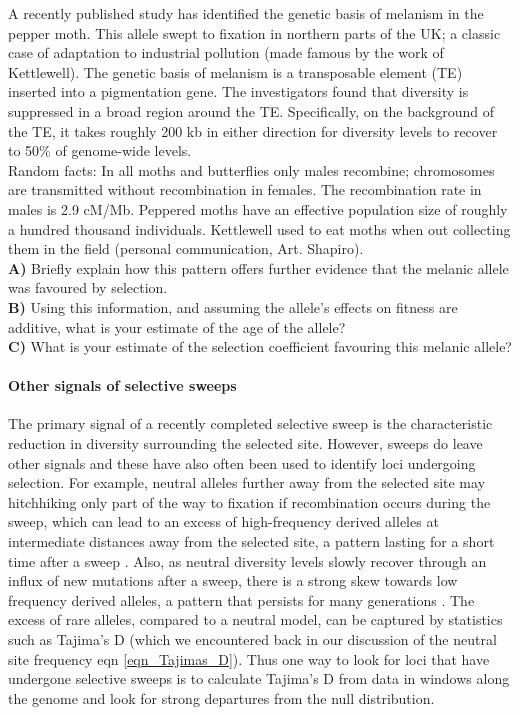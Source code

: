 \begin{question}
A recently published study has identified the genetic basis of
melanism in the pepper moth. This allele swept to fixation in northern
parts of the UK; a classic case of adaptation to industrial pollution
(made famous by the work of Kettlewell). The genetic basis of melanism
is a transposable element (TE) inserted into a pigmentation gene. The
investigators found that diversity is suppressed in a broad region
around the TE. Specifically, on the background of the TE, it takes
roughly 200 kb in either direction for diversity levels to recover to
50\% of genome-wide levels. \\

Random facts: In all moths and butterflies only males recombine;
chromosomes are transmitted without recombination in females. The
recombination rate in males is 2.9 cM/Mb.  Peppered moths have an
effective population size of roughly a hundred thousand
individuals. Kettlewell used to eat moths when out collecting them in
the field (personal communication, Art. Shapiro). \\
{\bf A)} Briefly explain how this pattern offers further evidence that the melanic allele was favoured by selection.\\
{\bf B)} Using this information, and assuming the allele's effects on fitness are additive, what is your estimate of the age of the allele? \\
{\bf C)} What is your estimate of the selection coefficient favouring this melanic allele?
\end{question}


\paragraph{Other signals of selective sweeps}
The primary signal of a recently completed selective sweep is the
characteristic reduction in diversity surrounding the selected site.
However, sweeps do leave other signals and these have also often been
used to identify loci undergoing selection. 
For example, neutral alleles further away from the selected site may
hitchhiking only part of the way to fixation if recombination occurs during
the sweep, which can lead to an excess of high-frequency
derived alleles at intermediate distances away from the selected site,
a pattern lasting for a short time after a sweep \citep{Fay:00,Przeworski:02,Kim:06}.
Also, as neutral diversity levels slowly recover through an influx of
new mutations after a sweep, there is a strong skew towards low
frequency derived alleles, a pattern that persists for many
generations \citep{Braverman:95, Przeworski:02,Kim:06}. The excess of
rare alleles, compared to a neutral model, can be captured by statistics such as Tajima's D (which
we encountered back in our discussion of the neutral site frequency eqn
\ref{eqn_Tajimas_D}). Thus one way to look for loci that have undergone selective sweeps is to calculate Tajima's D from data in
windows along the genome and look for
strong departures from the null distribution.


